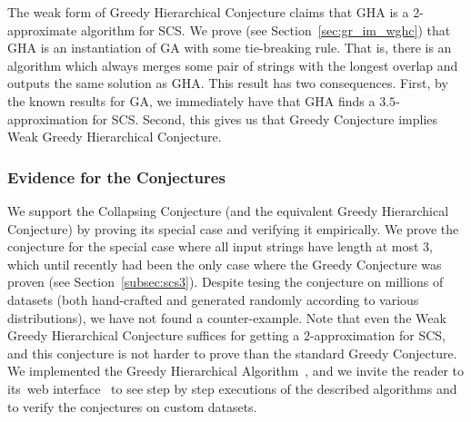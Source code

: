 The weak form of Greedy Hierarchical Conjecture claims that GHA is a 2-approximate algorithm for SCS. 
We prove (see Section~\ref{sec:gr_im_wghc}) that GHA is an instantiation of GA with some tie-breaking rule. That is, there is an algorithm which always merges some pair of strings with the longest overlap and outputs the same solution as GHA. This result has two consequences. First, by the known results for GA, we immediately have that GHA finds a $3.5$-approximation for SCS. Second, this gives us that Greedy Conjecture implies Weak Greedy Hierarchical Conjecture. 

\subsubsection{Evidence for the Conjectures}
We support the Collapsing Conjecture (and the equivalent Greedy Hierarchical Conjecture) by proving its special case and verifying it empirically. We prove the conjecture for the special case where all input strings have length at most $3$, which until recently had been the only case where the Greedy Conjecture was proven (see Section~\ref{subsec:scs3}). Despite tesing the conjecture on millions of datasets (both hand-crafted and generated randomly according to various distributions), we have not found a counter-example. Note that even the Weak Greedy Hierarchical Conjecture suffices for getting a $2$-approximation for SCS, and this conjecture is not harder to prove than the standard Greedy Conjecture.
We implemented the Greedy Hierarchical Algorithm~\cite{github}, and we invite the reader to its~web interface~\cite{webpage} to see step by step executions of the described algorithms and to verify the conjectures on
custom datasets.
